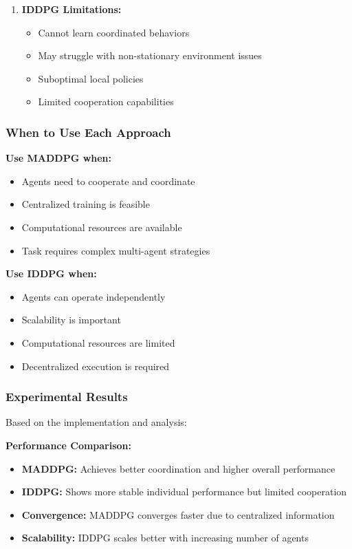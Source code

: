 \documentclass[12pt]{article}
\begin{document}
{{{{{{\begin{enumerate}
    \item \textbf{IDDPG Limitations:}
    \begin{itemize}
        \item Cannot learn coordinated behaviors
        \item May struggle with non-stationary environment issues
        \item Suboptimal local policies
        \item Limited cooperation capabilities
    \end{itemize}
\end{enumerate}

\subsubsection{When to Use Each Approach}

\textbf{Use MADDPG when:}
\begin{itemize}
    \item Agents need to cooperate and coordinate
    \item Centralized training is feasible
    \item Computational resources are available
    \item Task requires complex multi-agent strategies
\end{itemize}

\textbf{Use IDDPG when:}
\begin{itemize}
    \item Agents can operate independently
    \item Scalability is important
    \item Computational resources are limited
    \item Decentralized execution is required
\end{itemize}

\subsubsection{Experimental Results}

Based on the implementation and analysis:

\textbf{Performance Comparison:}
\begin{itemize}
    \item \textbf{MADDPG:} Achieves better coordination and higher overall performance
    \item \textbf{IDDPG:} Shows more stable individual performance but limited cooperation
    \item \textbf{Convergence:} MADDPG converges faster due to centralized information
    \item \textbf{Scalability:} IDDPG scales better with increasing number of agents
\end{itemize}

}}}}}}
\end{document}
